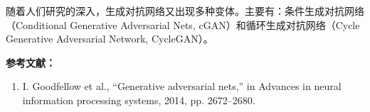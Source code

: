 随着人们研究的深入，生成对抗网络又出现多种变体。主要有：条件生成对抗网络（Conditional Generative Adversarial Nets, cGAN）和循环生成对抗网络（Cycle Generative Adversarial Network, CycleGAN）。




\textbf{参考文献：}
\begin{enumerate}
\item I. Goodfellow et al., “Generative adversarial nets,” in Advances in neural information processing systems, 2014, pp. 2672–2680.
\end{enumerate}